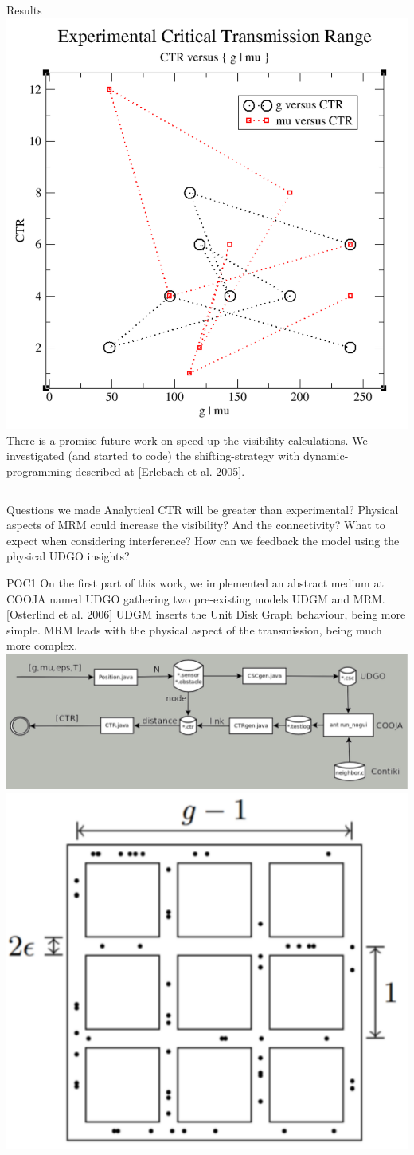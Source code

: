 \documentclass[final,hyperref={pdfpagelabels=false}]{beamer}
\begin{document}
\begin{frame}{}
\begin{block}{Results}
      \includegraphics[width=0.22\linewidth]{ctr_exp}
      \newline
      There is a promise future work on speed up the visibility calculations.       
      We investigated (and started to code) the shifting-strategy with dynamic-programming described at [Erlebach et al. 2005].
    \end{block}
    \vfill
    \vfill
    \vfill
    \begin{columns}[t]
      \begin{column}{.48\linewidth}
        \begin{block}{\large Questions we made}
          \centering
            Analytical CTR will be greater than experimental? \newline
            Physical aspects of MRM could increase the visibility? \newline 
            And the connectivity? What to expect when considering interference? \newline
            How can we feedback the model using the physical UDGO insights?
        \end{block}
        \begin{block}{POC1}
          \centering
          On the first part of this work, we implemented an abstract medium at
          COOJA named UDGO gathering two pre-existing models UDGM and MRM.
          [Osterlind et al. 2006]
          UDGM inserts the Unit Disk Graph behaviour, being more simple. MRM leads
          with the physical aspect of the transmission, being much more complex.\newline
          \includegraphics[width=0.9\linewidth]{sim-cycle}\newline
          \includegraphics[width=0.35\linewidth]{grid}

\end{block}
\end{column}
\end{columns}
\end{frame}
\end{document}
